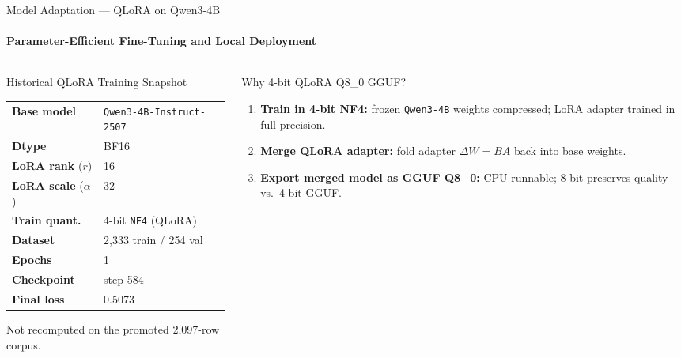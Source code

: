 \begin{frame}{Model Adaptation --- QLoRA on Qwen3-4B}
  \framesubtitle{Parameter-Efficient Fine-Tuning and Local Deployment}

  \begin{columns}[T,onlytextwidth]
    \begin{column}{0.45\textwidth}
      \begin{block}{Historical QLoRA Training Snapshot}
        {\footnotesize
        \renewcommand{\arraystretch}{1.05}
        \begin{tabular}{ll}
          \textbf{Base model} & {\scriptsize\texttt{Qwen3-4B-Instruct-2507}} \\
          \textbf{Dtype} & BF16 \\
          \textbf{LoRA rank} ($r$) & 16 \\
          \textbf{LoRA scale} ($\alpha$) & 32 \\
          \textbf{Train quant.} & 4-bit \texttt{NF4} (QLoRA) \\
          \textbf{Dataset} & 2{,}333 train / 254 val \\
          \textbf{Epochs} & 1 \\
          \textbf{Checkpoint} & step 584 \\
          \textbf{Final loss} & 0.5073 \\
        \end{tabular}}
      \end{block}
      {\scriptsize Not recomputed on the promoted 2,097-row corpus.}
    \end{column}

    \begin{column}{0.52\textwidth}
      \begin{block}{Why 4-bit QLoRA \textrightarrow{} Q8\_0 GGUF?}
        {\footnotesize
        \begin{enumerate}
          \setlength{\itemsep}{0.2em}
          \item \textbf{Train in 4-bit NF4:} frozen \texttt{Qwen3-4B} weights compressed; LoRA adapter trained in full precision.
          \item \textbf{Merge QLoRA adapter:} fold adapter $\Delta W = BA$ back into base weights.
          \item \textbf{Export merged model as GGUF Q8\_0:} CPU-runnable; 8-bit preserves quality vs.\ 4-bit GGUF.
        \end{enumerate}
        }
      \end{block}
    \end{column}
  \end{columns}
\end{frame}
